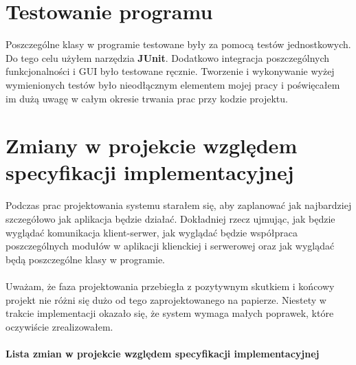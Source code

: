 \documentclass{article}
\begin{document}
\section{Testowanie programu}
    Poszczególne klasy w programie testowane były za pomocą testów jednostkowych.
    Do tego celu użyłem narzędzia \textbf{JUnit}.
    Dodatkowo integracja poszczególnych funkcjonalności i GUI było testowane ręcznie.
    Tworzenie i wykonywanie wyżej wymienionych testów było nieodłącznym elementem mojej pracy i poświęcałem im dużą uwagę w całym okresie trwania prac przy kodzie projektu.


\section{Zmiany w projekcie względem specyfikacji implementacyjnej}
    Podczas prac projektowania systemu starałem się, aby zaplanować jak najbardziej szczegółowo jak aplikacja będzie działać.
    Dokładniej rzecz ujmując, jak będzie wyglądać komunikacja klient-serwer, jak wyglądać będzie współpraca poszczególnych modułów w aplikacji klienckiej i serwerowej oraz jak wyglądać będą poszczególne klasy w programie.\\
    \\
    Uważam, że faza projektowania przebiegła z pozytywnym skutkiem i końcowy projekt nie różni się dużo od tego zaprojektowanego na papierze.
    Niestety w trakcie implementacji okazało się, że system wymaga małych poprawek, które oczywiście zrealizowałem.\\
    \\
    \textbf{Lista zmian w projekcie względem specyfikacji implementacyjnej}\\
\end{document}

